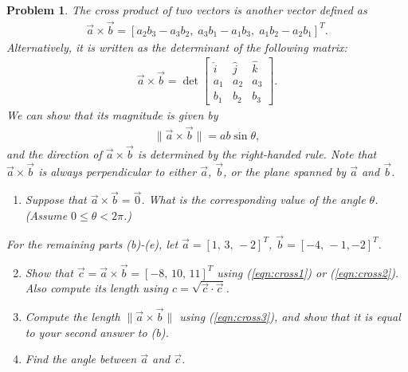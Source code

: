 \documentclass[10pt]{article}
\newcommand{\refeqn}[1]{(\ref{eqn:#1})}
\theoremstyle{plain}\theorembodyfont{\normalfont}
\newtheorem{prob}{Problem}[section]
\newenvironment{subprob}%
{\renewcommand{\theenumi}{\alph{enumi}}\renewcommand{\labelenumi}{(\theenumi)}\begin{enumerate}}%
{\end{enumerate}}%
\begin{document}
\begin{prob}
The cross product of two vectors is another vector defined as
\begin{align}
\vec a \times \vec b = [a_2b_3-a_3b_2,\; a_3b_1-a_1b_3,\; a_1b_2-a_2b_1]^T.\label{eqn:cross1}
\end{align}
Alternatively, it is written as the determinant of the following matrix:
\begin{align}
\vec a \times \vec b = \det
\begin{bmatrix}
\hat i & \hat j & \hat k\\
a_1 & a_2 & a_3\\
b_1 & b_2 & b_3
\end{bmatrix}.\label{eqn:cross2}
\end{align}
We can show that its magnitude is given by
\begin{align}
\| \vec a \times \vec b \| = a b \sin\theta,\label{eqn:cross3}
\end{align}
and the direction of $\vec a \times \vec b$ is determined by the right-handed rule. Note that $\vec a\times \vec b$ is always perpendicular to either $\vec a$, $\vec b$, or the plane spanned by $\vec a$ and $\vec b$.

\begin{subprob}
\item Suppose that $\vec a \times \vec b = \vec 0$. What is the corresponding value of the angle $\theta$. (Assume $0\leq\theta < 2 \pi$.)
\end{subprob}
For the remaining parts (b)-(e), let $\vec a = [1,\,3,\,-2]^T$, $\vec b =[-4,\,-1,-2]^T$. 
\begin{subprob}\setcounter{enumi}{1}
\item Show that $\vec c = \vec a \times \vec b=[-8,\,10,\,11]^T$ using \refeqn{cross1} or \refeqn{cross2}. Also compute its length using $c = \sqrt{\vec c \cdot \vec c}$.
\item Compute the length $\| \vec a \times \vec b \|$ using \refeqn{cross3}, and show that it is equal to your second answer to (b).
\item Find the angle between $\vec a$ and $\vec c$. 
\end{subprob}
\end{prob}
\end{document}
